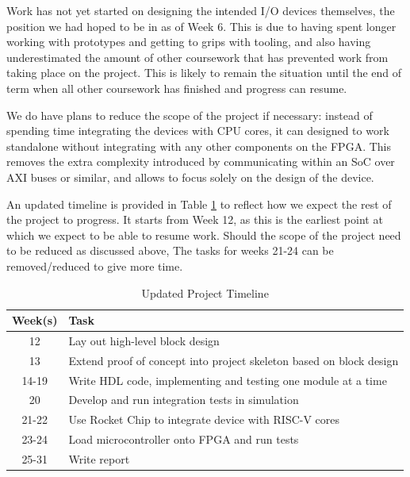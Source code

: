 \documentclass[a4paper,fleqn,12pt]{article}
\begin{document}
Work has not yet started on designing the intended I/O devices themselves, the position we had hoped to be in as of Week 6. This is due to having spent longer working with prototypes and getting to grips with tooling, and also having underestimated the amount of other coursework that has prevented work from taking place on the project. This is likely to remain the situation until the end of term when all other coursework has finished and progress can resume.

We do have plans to reduce the scope of the project if necessary: instead of spending time integrating the devices with CPU cores, it can designed to work standalone without integrating with any other components on the FPGA. This removes the extra complexity introduced by communicating within an SoC over AXI buses or similar, and allows to focus solely on the design of the device.

An updated timeline is provided in Table \ref{tab:timeline2} to reflect how we expect the rest of the project to progress. It starts from Week 12, as this is the earliest point at which we expect to be able to resume work. Should the scope of the project need to be reduced as discussed above, The tasks for weeks 21-24 can be removed/reduced to give more time.

\begin{table}[ht!]
	\centering
	\begin{tabular}{|c|l|}
		\hline
		\textbf{Week(s)} & \textbf{Task}                                                       \\ \hline
		12               & Lay out high-level block design                                     \\ \hline
		13               & Extend proof of concept into project skeleton based on block design \\ \hline
		14-19            & Write HDL code, implementing and testing one module at a time       \\ \hline
		20               & Develop and run integration tests in simulation                     \\ \hline
		21-22            & Use Rocket Chip to integrate device with RISC-V cores               \\ \hline
		23-24            & Load microcontroller onto FPGA and run tests                        \\ \hline
		25-31            & Write report                                                        \\ \hline
	\end{tabular}
	\caption{Updated Project Timeline}
	\label{tab:timeline2}
\end{table}
\end{document}
